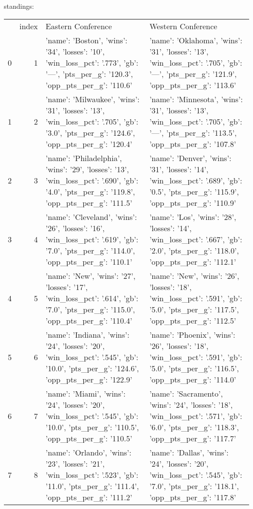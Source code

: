 {} standings:
\begin{tabular}{lrll}
 & index & Eastern Conference & Western Conference \\
0 & 1 & {'name': 'Boston', 'wins': '34', 'losses': '10', 'win_loss_pct': '.773', 'gb': '—', 'pts_per_g': '120.3', 'opp_pts_per_g': '110.6'} & {'name': 'Oklahoma', 'wins': '31', 'losses': '13', 'win_loss_pct': '.705', 'gb': '—', 'pts_per_g': '121.9', 'opp_pts_per_g': '113.6'} \\
1 & 2 & {'name': 'Milwaukee', 'wins': '31', 'losses': '13', 'win_loss_pct': '.705', 'gb': '3.0', 'pts_per_g': '124.6', 'opp_pts_per_g': '120.4'} & {'name': 'Minnesota', 'wins': '31', 'losses': '13', 'win_loss_pct': '.705', 'gb': '—', 'pts_per_g': '113.5', 'opp_pts_per_g': '107.8'} \\
2 & 3 & {'name': 'Philadelphia', 'wins': '29', 'losses': '13', 'win_loss_pct': '.690', 'gb': '4.0', 'pts_per_g': '119.8', 'opp_pts_per_g': '111.5'} & {'name': 'Denver', 'wins': '31', 'losses': '14', 'win_loss_pct': '.689', 'gb': '0.5', 'pts_per_g': '115.9', 'opp_pts_per_g': '110.9'} \\
3 & 4 & {'name': 'Cleveland', 'wins': '26', 'losses': '16', 'win_loss_pct': '.619', 'gb': '7.0', 'pts_per_g': '114.0', 'opp_pts_per_g': '110.1'} & {'name': 'Los', 'wins': '28', 'losses': '14', 'win_loss_pct': '.667', 'gb': '2.0', 'pts_per_g': '118.0', 'opp_pts_per_g': '112.1'} \\
4 & 5 & {'name': 'New', 'wins': '27', 'losses': '17', 'win_loss_pct': '.614', 'gb': '7.0', 'pts_per_g': '115.0', 'opp_pts_per_g': '110.4'} & {'name': 'New', 'wins': '26', 'losses': '18', 'win_loss_pct': '.591', 'gb': '5.0', 'pts_per_g': '117.5', 'opp_pts_per_g': '112.5'} \\
5 & 6 & {'name': 'Indiana', 'wins': '24', 'losses': '20', 'win_loss_pct': '.545', 'gb': '10.0', 'pts_per_g': '124.6', 'opp_pts_per_g': '122.9'} & {'name': 'Phoenix', 'wins': '26', 'losses': '18', 'win_loss_pct': '.591', 'gb': '5.0', 'pts_per_g': '116.5', 'opp_pts_per_g': '114.0'} \\
6 & 7 & {'name': 'Miami', 'wins': '24', 'losses': '20', 'win_loss_pct': '.545', 'gb': '10.0', 'pts_per_g': '110.5', 'opp_pts_per_g': '110.5'} & {'name': 'Sacramento', 'wins': '24', 'losses': '18', 'win_loss_pct': '.571', 'gb': '6.0', 'pts_per_g': '118.3', 'opp_pts_per_g': '117.7'} \\
7 & 8 & {'name': 'Orlando', 'wins': '23', 'losses': '21', 'win_loss_pct': '.523', 'gb': '11.0', 'pts_per_g': '111.4', 'opp_pts_per_g': '111.2'} & {'name': 'Dallas', 'wins': '24', 'losses': '20', 'win_loss_pct': '.545', 'gb': '7.0', 'pts_per_g': '118.1', 'opp_pts_per_g': '117.8'} \\

\end{tabular}
